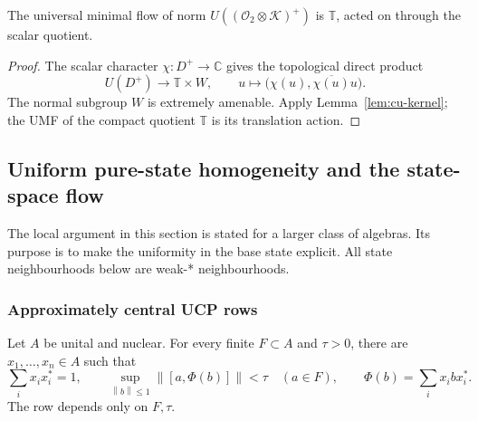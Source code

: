 \begin{corollary}\label{cor:cu-scalar-umf}
 The universal minimal flow of norm $U((\mathcal{O}_2\otimes\mathcal{K})^+)$ is $\mathbb{T}$, acted on through the scalar
quotient.
\end{corollary}

\begin{proof}
The scalar character $\chi:D^+\to\mathbb{C}$ gives the topological direct
product 
\begin{equation*}
U(D^+)\longrightarrow\mathbb{T}\times W,\qquad u\longmapsto\bigl(\chi(u),\overline{\chi(u)}u\bigr).
\end{equation*}
The normal subgroup $W$ is extremely amenable. Apply Lemma~\ref{lem:cu-kernel};
the UMF of the compact quotient $\mathbb{T}$ is its translation action.
\end{proof}


\subsection{Uniform pure-state homogeneity and the state-space flow}

\label{sec:cu-state}

The local argument in this section is stated for a larger class of algebras.
Its purpose is to make the uniformity in the base state explicit. All state
neighbourhoods below are weak-* neighbourhoods.


\subsubsection{Approximately central UCP rows}

\begin{lemma}\label{lem:cu-central-row}
 Let $A$ be unital and nuclear. For every finite $F\subset A$ and $\tau>0$, there are $x_1,\ldots,x_n\in A$ such that 
\begin{equation*}
\sum_i x_ix_i^*=1,\qquad
\sup_{\left\|b\right\|\leq1}\left\|[a,\Phi(b)]\right\|<\tau\quad(a\in F),
\qquad \Phi(b)=\sum_i x_i b x_i^*.
\end{equation*}
The row depends only on $F,\tau$.
\end{lemma}


